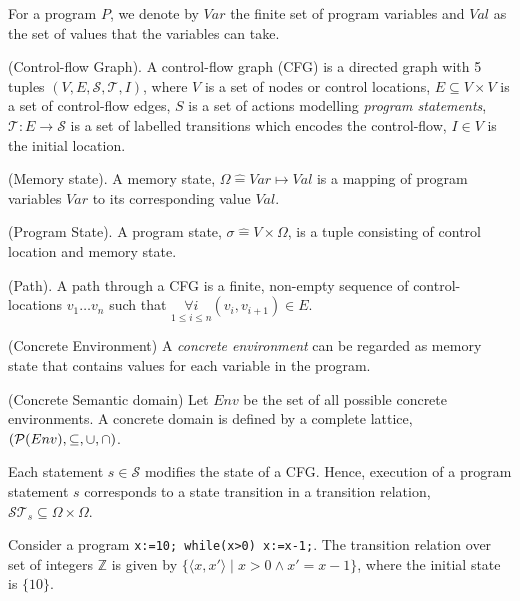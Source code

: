 %
For a program $P$, we denote by $Var$ the finite set of program variables 
and $Val$ as the set of values that the variables can take. 
%
\begin{definition} (Control-flow Graph). A control-flow graph (CFG) is a directed
  graph with 5 tuples $(V, E, \mathcal{S}, \mathcal{T}, I)$, where
$V$ is a set of nodes or control locations, $E \subseteq V \times V$
is a set of control-flow edges, $S$ is a set of actions modelling \emph{program 
  statements}, $\mathcal{T} \colon E \rightarrow \mathcal{S}$ is a set of labelled
transitions which encodes the control-flow, $I \in V$ is the initial
location.
\end{definition}
%
\begin{definition} (Memory state). A memory state, $\Omega
  \mathrel{\hat=} Var \mapsto Val$ is a mapping of program 
  variables $Var$ to its corresponding value $Val$. 
\end{definition}
%
\begin{definition} (Program State). A program state, $\sigma \mathrel{\hat=} V \times
  \Omega$, is a tuple consisting of control location and memory state.
\end{definition}
%
\begin{definition} (Path). A path through a CFG is a finite, non-empty sequence
  of control-locations $v_1 \ldots v_n$ such that $\underset{1 \leq i \leq n}{\forall i} 
  (v_i, v_{i+1}) \in E$. 
\end{definition}
%
\begin{definition} (Concrete Environment)
A \emph{concrete environment} can be regarded as memory state that contains values 
for each variable in the program. 
\end{definition}
%
\begin{definition} (Concrete Semantic domain)
Let $Env$ be the set of all possible concrete environments.  
A concrete domain is defined by a complete lattice,
  $(\mathcal{P}(Env),\subseteq,\cup,\cap)$. 
\end{definition}
%
Each statement $s \in \mathcal{S}$ modifies the state of a CFG. Hence, execution
of a program statement $s$ corresponds to a state transition in a transition
relation, $\mathcal{ST}_{s} \subseteq \Omega \times \Omega$.  
%
\begin{example}
  Consider a program \texttt{x:=10; while(x>0) x:=x-1;}.  The transition
  relation over set of integers $\mathbb{Z}$ is given by 
  $\{\langle x, x' \rangle \mid x>0 \wedge x'=x-1\}$, where the initial state is
  $\{10\}$.
\end{example}
